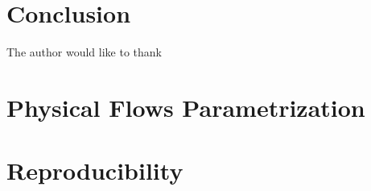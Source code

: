 \documentclass[Royal,sageh,times]{sagej}
\begin{document}
\section{Conclusion}






\begin{acks}
The author would like to thank
\end{acks}












\section*{Physical Flows Parametrization}



\section*{Reproducibility}

\end{document}
